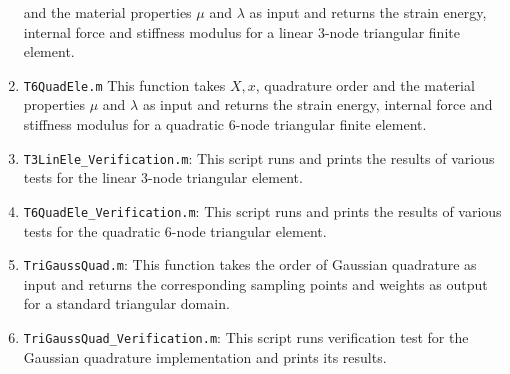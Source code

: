 \documentclass[../main.tex]{subfiles}
\begin{document}
\begin{enumerate}
  and the material properties $\mu$ and $\lambda$ as input and returns
  the strain energy, internal force and stiffness modulus for a linear
  3-node triangular finite element.
\item \texttt{T6QuadEle.m} This function takes $X,x$, quadrature order
  and the material properties $\mu$ and $\lambda$ as input and returns
  the strain energy, internal force and stiffness modulus for a quadratic
  6-node triangular finite element.
\item \texttt{T3LinEle\_Verification.m}: This script runs and prints
  the results of various tests for the linear 3-node triangular
  element.
\item \texttt{T6QuadEle\_Verification.m}: This script runs and prints
  the results of various tests for the quadratic 6-node triangular
  element.
\item \texttt{TriGaussQuad.m}: This function takes the order of
  Gaussian quadrature as input and returns the corresponding sampling
  points and weights as output for a standard triangular domain.
\item \texttt{TriGaussQuad\_Verification.m}: This script runs
  verification test for the Gaussian quadrature implementation and
  prints its results.
\end{enumerate}
\end{document}
